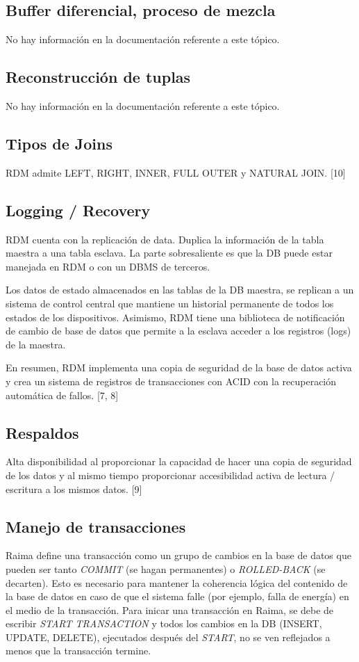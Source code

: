 \documentclass{acmart}
\begin{document}
\subsection{Buffer diferencial, proceso de mezcla}
No hay información en la documentación referente a este tópico.
\subsection{Reconstrucción de tuplas}
No hay información en la documentación referente a este tópico.
\subsection{Tipos de Joins}
RDM admite LEFT, RIGHT, INNER, FULL OUTER y NATURAL JOIN. [10]
\subsection{Logging / Recovery}
RDM cuenta con la replicación de data. Duplica la información de la tabla maestra a una tabla esclava. La parte sobresaliente es que la DB puede estar manejada en RDM o con un DBMS de terceros.

Los datos de estado almacenados en las tablas de la DB maestra, se replican a un sistema de control central que mantiene un historial permanente de todos los estados de los dispositivos. Asimismo, RDM tiene una biblioteca de notificación de cambio de base de datos que permite a la esclava acceder a los registros (logs) de la maestra.

En resumen, RDM implementa una copia de seguridad de la base de datos activa y crea un sistema de registros de transacciones con ACID con la recuperación automática de fallos. [7, 8]
\subsection{Respaldos}
Alta disponibilidad al proporcionar la capacidad de hacer una copia de seguridad de los datos y al mismo tiempo proporcionar accesibilidad activa de lectura / escritura a los mismos datos. [9]
\subsection{Manejo de transacciones}
Raima define una transacción como un grupo de cambios en la base de datos que pueden ser tanto \textit{COMMIT} (se hagan permanentes) o \textit{ROLLED-BACK} (se decarten). Esto es necesario para mantener la coherencia lógica del contenido de la base de datos en caso de que el sistema falle (por ejemplo, falla de energía) en el medio de la transacción. Para inicar una transacción en Raima, se debe de escribir \textit{START TRANSACTION} y todos los cambios en la DB (INSERT, UPDATE, DELETE), ejecutados después del \textit{START}, no se ven reflejados a menos que la transacción termine. 
\end{document}
